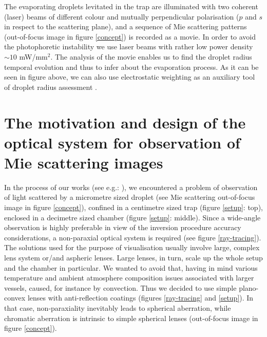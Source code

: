 \documentclass[12pt,dvips]{elsarticle}
\begin{document}
The evaporating droplets levitated in the trap are illuminated with two coherent (laser) beams of different colour and
mutually perpendicular polarisation ($p$ and $s$ in respect to the scattering plane), and a sequence of Mie scattering
patterns (out-of-focus image in figure \ref{concept}) is recorded as a movie. In order to avoid the photophoretic
instability we use laser beams with rather low power density $\sim 10$ mW/mm$^2$. The analysis of the movie enables us to
find the droplet radius temporal evolution and thus to infer about the evaporation process. As it can be seen in figure
above, we can also use electrostatic weighting as an auxiliary tool of droplet radius assessment \cite{weightvsscatt}.

\section{The motivation and design of the optical system for observation of Mie scattering images}
In the process of our works (see e.g.: \cite{RoP,weightvsscatt}), we encountered a problem of observation of light
scattered by a micrometre sized droplet (see Mie scattering out-of-focus image in figure \ref{concept}), confined in a
centimetre sized trap (figure \ref{setup}: top), enclosed in a decimetre sized chamber (figure \ref{setup}: middle). Since
a wide-angle observation is highly preferable in view of the inversion procedure accuracy considerations, a non-paraxial
optical system is required (see figure \ref{ray-tracing}). The solutions used for the purpose of visualisation usually
involve large, complex lens system or/and aspheric lenses. Large lenses, in turn, scale up the whole setup and the chamber
in particular. We wanted to avoid that, having in mind various temperature and ambient atmosphere composition issues
associated with larger vessels, caused, for instance by convection. Thus we decided to use simple plano-convex lenses with
anti-reflection coatings (figures \ref{ray-tracing} and \ref{setup}). In that case, non-paraxiality inevitably leads to
spherical aberration, while chromatic aberration is intrinsic to simple spherical lenses (out-of-focus image in figure
\ref{concept}).
\end{document}

